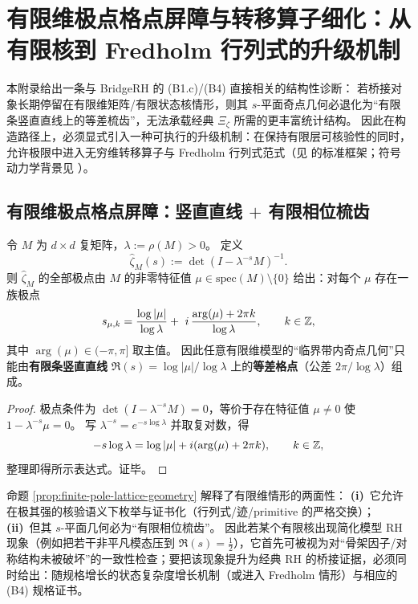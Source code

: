 \section{有限维极点格点屏障与转移算子细化：从有限核到 Fredholm 行列式的升级机制}\label{app:pole-lattice-transfer-operator-upgrade}

本附录给出一条与 BridgeRH 的 (B1.c)/(B4) 直接相关的结构性诊断：
若桥接对象长期停留在有限维矩阵/有限状态核情形，则其 \(s\)-平面奇点几何必退化为“有限条竖直直线上的等差梳齿”，无法承载经典 \(\Xi_\zeta\) 所需的更丰富统计结构。
因此在构造路径上，必须显式引入一种可执行的升级机制：在保持有限层可核验性的同时，允许极限中进入无穷维转移算子与 Fredholm 行列式范式（见 \cite{Ruelle1976ZetaExpanding,Ruelle1978Thermodynamic,ParryPollicott1990Zeta} 的标准框架；符号动力学背景见 \cite{LindMarcus1995}）。

\subsection{有限维极点格点屏障：竖直直线 \texorpdfstring{$+$}{+} 有限相位梳齿}\label{subsec:finite-pole-lattice-barrier-bridge}

\begin{proposition}[有限维行列式 \texorpdfstring{$\Rightarrow$}{=>} 极点格点几何]\label{prop:finite-pole-lattice-geometry}
令 \(M\) 为 \(d\times d\) 复矩阵，\(\lambda:=\rho(M)>0\)。
定义
$$
\widehat{\zeta}_M(s):=\det(I-\lambda^{-s}M)^{-1}.
$$
则 \(\widehat{\zeta}_M\) 的全部极点由 \(M\) 的非零特征值 \(\mu\in\mathrm{spec}(M)\setminus\{0\}\) 给出：对每个 \(\mu\) 存在一族极点
$$
s_{\mu,k}
=\frac{\log|\mu|}{\log\lambda}
+\ i\,\frac{\arg(\mu)+2\pi k}{\log\lambda},
\qquad k\in\mathbb{Z},
$$
其中 \(\arg(\mu)\in(-\pi,\pi]\) 取主值。
因此任意有限维模型的“临界带内奇点几何”只能由\textbf{有限条竖直直线} \(\Re(s)=\log|\mu|/\log\lambda\) 上的\textbf{等差格点}（公差 \(2\pi/\log\lambda\)）组成。
\end{proposition}
\begin{proof}
极点条件为 \(\det(I-\lambda^{-s}M)=0\)，等价于存在特征值 \(\mu\neq 0\) 使 \(1-\lambda^{-s}\mu=0\)。
写 \(\lambda^{-s}=e^{-s\log\lambda}\) 并取复对数，得
$$
-s\log\lambda=\log|\mu|+i(\arg(\mu)+2\pi k),\qquad k\in\mathbb{Z},
$$
整理即得所示表达式。证毕。
\end{proof}

\begin{remark}\label{rem:finite-pole-lattice-meaning}
命题 \ref{prop:finite-pole-lattice-geometry} 解释了有限维情形的两面性：
\textbf{(i)}~它允许在极其强的核验语义下枚举与证书化（行列式/迹/primitive 的严格交换）；
\textbf{(ii)}~但其 \(s\)-平面几何必为“有限相位梳齿”。
因此若某个有限核出现简化模型 RH 现象（例如把若干非平凡模态压到 \(\Re(s)=\tfrac12\)），它首先可被视为对“骨架因子/对称结构未被破坏”的一致性检查；要把该现象提升为经典 RH 的桥接证据，必须同时给出：随规格增长的状态复杂度增长机制（或进入 Fredholm 情形）与相应的 (B4) 规格证书。
\end{remark}

